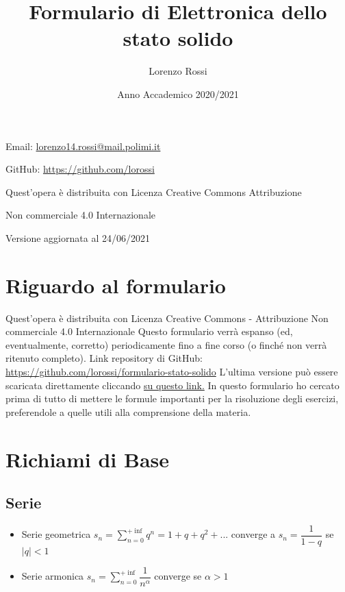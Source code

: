 \documentclass{article}
\title{\Huge Formulario di Elettronica dello stato solido}
\author{\LARGE Lorenzo Rossi}
\date{\LARGE Anno Accademico 2020/2021}
\begin{document}
\maketitle

\vspace{18em}

\large
\begin{doublespacing}\hypersetup{
    urlcolor=black,
  }
  \centerline{Email: \href{mailto://lorenzo14.rossi@mail.polimi.it}{lorenzo14.rossi@mail.polimi.it}}
  \centerline{GitHub: \url{https://github.com/lorossi}}

  \vspace{18em}
  \centerline{Quest'opera è distribuita con Licenza Creative Commons Attribuzione}
  \centerline{Non commerciale 4.0 Internazionale \ccbynceu}
  \centerline{Versione aggiornata al 24/06/2021}
\end{doublespacing}
\newpage


\tableofcontents
\clearpage
{}
\newpage

\section{Riguardo al formulario}
Quest'opera è distribuita con Licenza Creative Commons - Attribuzione Non commerciale 4.0 Internazionale \ccbynceu \newline
Questo formulario verrà espanso (ed, eventualmente, corretto) periodicamente fino a fine corso (o finché non verrà ritenuto completo). \newline
Link repository di GitHub: \url{https://github.com/lorossi/formulario-stato-solido} \newline
L'ultima versione può essere scaricata direttamente cliccando \href{https://github.com/lorossi/formulario-stato-solido/raw/master/formulario-elettronica-dello-stato-solido.pdf}{su questo link.} \newline
In questo formulario ho cercato prima di tutto di mettere le formule importanti per la risoluzione degli esercizi, preferendole a quelle utili alla comprensione della materia.

\newpage

\section{Richiami di Base}
\subsection{Serie}
\begin{itemize}
  \item Serie geometrica \( \displaystyle  s_n = \sum_{n=0}^{+\inf} q^n = 1 + q + q^2 + ... \) converge a \( s_n = \dfrac{1}{1-q} \) se \( |q| < 1 \)
  \item Serie armonica \( \displaystyle s_n = \sum_{n=0}^{+\inf} \dfrac{1}{n ^ \alpha} \) converge se \( \alpha > 1 \)
\end{itemize}
\end{document}
